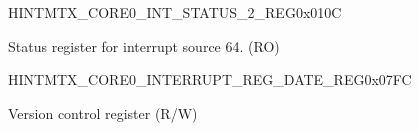 \begin{register}{H}{INTMTX\_CORE0\_INT\_STATUS\_2\_REG}{0x010C}\label{regdesc:INTMTXCORE0INTSTATUS2REG}
%
\regnewline%
\begin{regdesc}\begin{reglist}
\label{fielddesc:INTMTXCORE0INTSTATUS2}\item [INTMTX\_CORE0\_INT\_STATUS\_2] Status register for interrupt source 64. (RO)
\end{reglist}\end{regdesc}
\end{register}




\begin{register}{H}{INTMTX\_CORE0\_INTERRUPT\_REG\_DATE\_REG}{0x07FC}\label{regdesc:INTMTXCORE0INTERRUPTREGDATEREG}
%
%
\regnewline%
\begin{regdesc}\begin{reglist}
\label{fielddesc:INTMTXCORE0INTERRUPTREGDATE}\item [INTMTX\_CORE0\_INTERRUPT\_REG\_DATE] Version control register (R/W)
\end{reglist}\end{regdesc}
\end{register}


